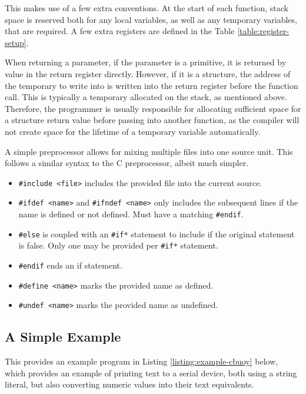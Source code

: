 \documentclass{article}
\begin{document}
This makes use of a few extra conventions. At the start of each function, stack space is reserved both for any local variables, as well as any temporary variables, that are required. A few extra registers are defined in the Table \ref{table:register-setup}.

When returning a parameter, if the parameter is a primitive, it is returned by value in the return register directly. However, if it is a structure, the address of the temporary to write into is written into the return register before the function call. This is typically a temporary allocated on the stack, as mentioned above. Therefore, the programmer is usually responsible for allocating sufficient space for a structure return value before passing into another function, as the compiler will not create space for the lifetime of a temporary variable automatically.

A simple preprocessor allows for mixing multiple files into one source unit. This follows a similar syntax to the C preprocessor, albeit much simpler.

\begin{itemize}
	\item \texttt{\#include <file>} includes the provided file into the current source.
	\item \texttt{\#ifdef <name>} and \texttt{\#ifndef <name>} only includes the subsequent lines if the name is defined or not defined. Must have a matching \texttt{\#endif}.
	\item \texttt{\#else} is coupled with an \texttt{\#if*} statement to include if the original statement is false. Only one may be provided per \texttt{\#if*} statement.
	\item \texttt{\#endif} ends an if statement.
	\item \texttt{\#define <name>} marks the provided name as defined.
	\item \texttt{\#undef <name>} marks the provided name as undefined.
\end{itemize}

\subsection{A Simple Example}

This provides an example program in Listing \ref{listing:example-cbuoy} below, which provides an example of printing text to a serial device, both using a string literal, but also converting numeric values into their text equivalents.
\end{document}
